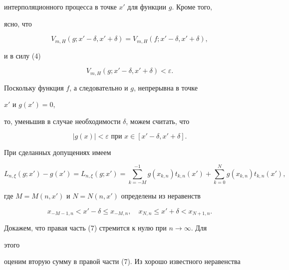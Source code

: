 \begin{pf}
интерполяционного процесса в точке $x'$ для функции $g$. Кроме того,


ясно, что


$$


V_{m,H}(g;x'-\delta,x'+\delta)=V_{m,H}(f;x'-\delta,x'+\delta),


$$


и в силу (4)


\begin{equation}


V_{m,H}(g;x'-\delta,x'+\delta)<\varepsilon.


\end{equation}





Поскольку функция $f$, а следовательно и $g$, непрерывна в точке


$x'$ и $g(x')=0$,


то, уменьшив в случае необходимости $\delta$, можем считать, что


\begin{equation}


|g(x)|<\varepsilon\text{ при }x\in[x'-\delta,x'+\delta].


\end{equation}


При сделанных допущениях имеем


\begin{equation}


L_{n,\xi}(g;x')-g(x')=L_{n,\xi}(g;x')=




\sum^{-1}_{k=-M}g(x_{k,n})t_{k,n}(x')+


\sum^N_{k=0}g(x_{k,n})t_{k,n}(x'),


\end{equation}


где $M=M(n,x')$ и $N=N(n,x')$ определены из неравенств


$$


x_{-M-1,n}<x'-\delta\le x_{-M,n},\quad


x_{N,n}\le x'+\delta<x_{N+1,n}.


$$





Докажем, что правая часть (7) стремится к нулю при $n\to\infty$. Для


этого


оценим вторую сумму в правой части (7). Из хорошо известного неравенства



\end{pf}
